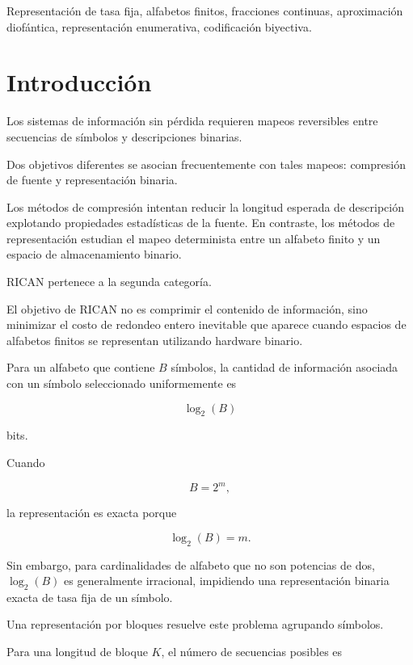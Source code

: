 \documentclass[onecolumn]{IEEEtran}
\begin{document}
\begin{IEEEkeywords}

Representación de tasa fija,
alfabetos finitos,
fracciones continuas,
aproximación diofántica,
representación enumerativa,
codificación biyectiva.

\end{IEEEkeywords}


\section{Introducción}

Los sistemas de información sin pérdida requieren mapeos reversibles
entre secuencias de símbolos y descripciones binarias.

Dos objetivos diferentes se asocian frecuentemente con tales mapeos:
compresión de fuente y representación binaria.

Los métodos de compresión intentan reducir la longitud esperada de
descripción explotando propiedades estadísticas de la fuente. En
contraste, los métodos de representación estudian el mapeo
determinista entre un alfabeto finito y un espacio de almacenamiento
binario.

RICAN pertenece a la segunda categoría.

El objetivo de RICAN no es comprimir el contenido de información, sino
minimizar el costo de redondeo entero inevitable que aparece cuando
espacios de alfabetos finitos se representan utilizando hardware
binario.

Para un alfabeto que contiene $B$ símbolos, la cantidad de información
asociada con un símbolo seleccionado uniformemente es

\[
\log_2(B)
\]

bits.

Cuando

\[
B=2^m ,
\]

la representación es exacta porque

\[
\log_2(B)=m .
\]

Sin embargo, para cardinalidades de alfabeto que no son potencias de
dos, $\log_2(B)$ es generalmente irracional, impidiendo una
representación binaria exacta de tasa fija de un símbolo.

Una representación por bloques resuelve este problema agrupando
símbolos.

Para una longitud de bloque $K$, el número de secuencias posibles es
\end{document}
